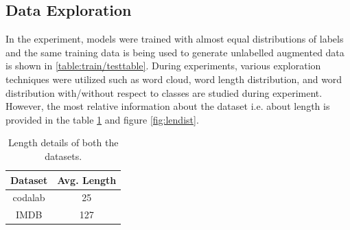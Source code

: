 \documentclass[%
	BCOR=8mm, %
	DIV=12,
	toc=bibliography, %
	toc=listof, %
	oneside, %
	egregdoesnotlikesansseriftitles, %
	]{scrbook}
\begin{document}
\subsection{Data Exploration}
\label{subsection:dataexploration}
In the experiment, models were trained with almost equal distributions of labels and the same training data is being used to generate unlabelled augmented data is shown in \ref{table:train/testtable}. During experiments, various exploration techniques were utilized such as word cloud, word length distribution, and word distribution with/without respect to classes are studied during experiment. However, the most relative information about the dataset i.e. about length is provided in the table \ref{table:Length stat } and figure \ref{fig:lendist}.
\begin{table}[!h]
\centering
\begin{tabular}{ |c|c| }
\hline
Dataset &  Avg. Length  \\
\hline
codalab & 25  \\
IMDB & 127  \\
\hline
\end{tabular}
\caption[Length details of datasets]{Length details of both the datasets.}
\label{table:Length stat }
\end{table}
\end{document}
